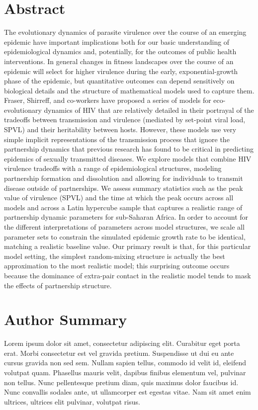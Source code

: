 \documentclass[10pt,letterpaper]{article}
\begin{document}
\section*{Abstract}
The evolutionary dynamics of parasite virulence over the
  course of an emerging epidemic have important implications both for
  our basic understanding of epidemiological dynamics and,
  potentially, for the outcomes of public health interventions. In
  general changes in fitness landscapes over the course of an epidemic
  will select for higher virulence during the early,
  exponential-growth phase of the epidemic, but quantitative outcomes
  can depend sensitively on biological details and the structure of
  mathematical models used to capture them.  Fraser, Shirreff, and
  co-workers have proposed a series of models for eco-evolutionary
  dynamics of HIV that are relatively detailed in their portrayal of
  the tradeoffs between transmission and virulence (mediated by
  set-point viral load, SPVL) and their heritability between
  hosts. However, these models use very simple implicit
  representations of the transmission process that ignore the
  partnership dynamics that previous research has found to be critical
  in predicting epidemics of sexually transmitted diseases.  We
  explore models that combine HIV virulence tradeoffs with a range of
  epidemiological structures, modeling partnership formation and
  dissolution and allowing for individuals to transmit disease outside
  of partnerships. We assess summary statistics such as the peak value
  of virulence (SPVL) and the time at which the peak occurs across all
  models and across a Latin hypercube sample that captures a realistic
  range of partnership dynamic parameters for sub-Saharan Africa. In
  order to account for the different interpretations of parameters
  across model structures, we scale all parameter sets to constrain
  the simulated epidemic growth rate to be identical, matching a
  realistic baseline value. Our primary result is that, for this
  particular model setting, the simplest random-mixing structure is
  actually the best approximation to the most realistic model; this
  surprising outcome occurs because the dominance of extra-pair
  contact in the realistic model tends to mask the effects of
  partnership structure.

\section*{Author Summary}
Lorem ipsum dolor sit amet, consectetur adipiscing elit. Curabitur eget porta erat. Morbi consectetur est vel gravida pretium. Suspendisse ut dui eu ante cursus gravida non sed sem. Nullam sapien tellus, commodo id velit id, eleifend volutpat quam. Phasellus mauris velit, dapibus finibus elementum vel, pulvinar non tellus. Nunc pellentesque pretium diam, quis maximus dolor faucibus id. Nunc convallis sodales ante, ut ullamcorper est egestas vitae. Nam sit amet enim ultrices, ultrices elit pulvinar, volutpat risus.
\end{document}
